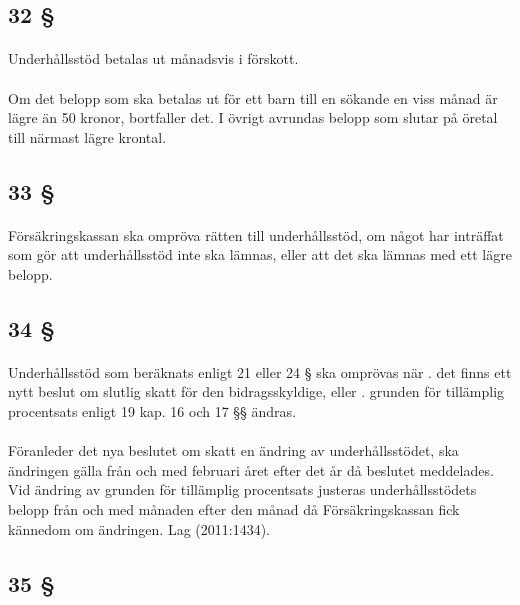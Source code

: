 \documentclass[a4paper,notitlepage,openany,10pt]{book}
\begin{document}
\subsection*{32 §}
\paragraph*{}
Underhållsstöd betalas ut månadsvis i förskott.
\paragraph*{}
Om det belopp som ska betalas ut för ett barn till en sökande en viss månad är lägre än 50 kronor, bortfaller det. I övrigt avrundas belopp som slutar på öretal till närmast lägre krontal.
\subsection*{33 §}
\paragraph*{}
Försäkringskassan ska ompröva rätten till underhållsstöd, om något har inträffat som gör att underhållsstöd inte ska lämnas, eller att det ska lämnas med ett lägre belopp.
\subsection*{34 §}
\paragraph*{}
Underhållsstöd som beräknats enligt 21 eller 24 § ska omprövas när
. det finns ett nytt beslut om slutlig skatt för den bidragsskyldige, eller
. grunden för tillämplig procentsats enligt 19 kap. 16 och 17 §§ ändras.
\paragraph*{}
Föranleder det nya beslutet om skatt en ändring av underhållsstödet, ska ändringen gälla från och med februari året efter det år då beslutet meddelades. Vid ändring av grunden för tillämplig procentsats justeras underhållsstödets belopp från och med månaden efter den månad då Försäkringskassan fick kännedom om ändringen.
Lag (2011:1434).
\subsection*{35 §}
\end{document}
